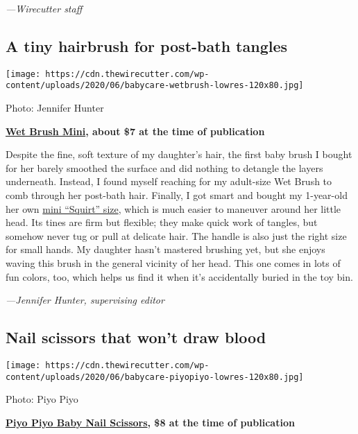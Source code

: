 \emph{---Wirecutter staff}

\hypertarget{a-tiny-hairbrush-for-post-bath-tangles}{%
\subsection{A tiny hairbrush for post-bath
tangles}\label{a-tiny-hairbrush-for-post-bath-tangles}}

\texttt{[image: https://cdn.thewirecutter.com/wp-content/uploads/2020/06/babycare-wetbrush-lowres-120x80.jpg]}

Photo: Jennifer Hunter

\textbf{\href{https://www.nytimes3xbfgragh.onion/wirecutter/out/link/39070/162825/4/115957/?merchant=Amazon}{Wet
Brush Mini}, about \$7 at the time of publication}

Despite the fine, soft texture of my daughter's hair, the first baby
brush I bought for her barely smoothed the surface and did nothing to
detangle the layers underneath. Instead, I found myself reaching for my
adult-size Wet Brush to comb through her post-bath hair. Finally, I got
smart and bought my 1-year-old her own
\href{https://www.nytimes3xbfgragh.onion/wirecutter/out/link/39070/162825/4/115957/?merchant=Amazon}{mini
``Squirt'' size}, which is much easier to maneuver around her little
head. Its tines are firm but flexible; they make quick work of tangles,
but somehow never tug or pull at delicate hair. The handle is also just
the right size for small hands. My daughter hasn't mastered brushing
yet, but she enjoys waving this brush in the general vicinity of her
head. This one comes in lots of fun colors, too, which helps us find it
when it's accidentally buried in the toy bin.

\emph{---Jennifer Hunter, supervising editor}

\hypertarget{nail-scissors-that-wont-draw-blood}{%
\subsection{Nail scissors that won't draw
blood}\label{nail-scissors-that-wont-draw-blood}}

\texttt{[image: https://cdn.thewirecutter.com/wp-content/uploads/2020/06/babycare-piyopiyo-lowres-120x80.jpg]}

Photo: Piyo Piyo

\textbf{\href{https://www.nytimes3xbfgragh.onion/wirecutter/out/link/39077/162832/4/115958/?merchant=Amazon}{Piyo
Piyo Baby Nail Scissors}, \$8 at the time of publication}


